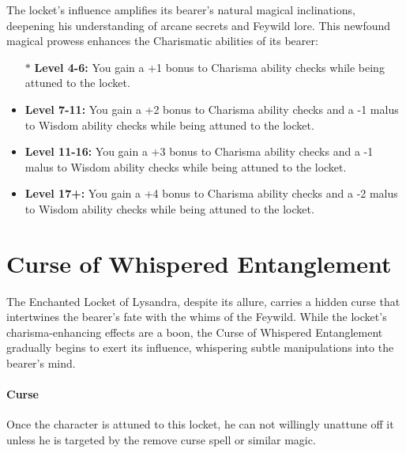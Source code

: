 \documentclass[letterpaper,openany,oneside,twocolumn]{book}
\begin{document}
The locket's influence amplifies its bearer's natural magical inclinations, deepening his understanding of arcane secrets and Feywild lore. This newfound magical prowess enhances the Charismatic abilities of its bearer:
\begin{itemize}
	\item[$\ast$] \textbf{Level 4-6:} You gain a +1 bonus to Charisma ability checks while being attuned to the locket.
	\item \textbf{Level 7-11:} You gain a +2 bonus to Charisma ability checks and a -1 malus to Wisdom ability checks while being attuned to the locket.
	\item \textbf{Level 11-16:} You gain a +3 bonus to Charisma ability checks and a -1 malus to Wisdom ability checks while being attuned to the locket.
	\item \textbf{Level 17+:} You gain a +4 bonus to Charisma ability checks and a -2 malus to Wisdom ability checks while being attuned to the locket.
\end{itemize}
\section*{Curse of Whispered Entanglement}
The Enchanted Locket of Lysandra, despite its allure, carries a hidden curse that intertwines the bearer's fate with the whims of the Feywild. While the locket's charisma-enhancing effects are a boon, the Curse of Whispered Entanglement gradually begins to exert its influence, whispering subtle manipulations into the bearer's mind.

\paragraph*{Curse}
Once the character is attuned to this locket, he can not willingly unattune off it unless he is targeted by the remove curse spell or similar magic.
\end{document}
